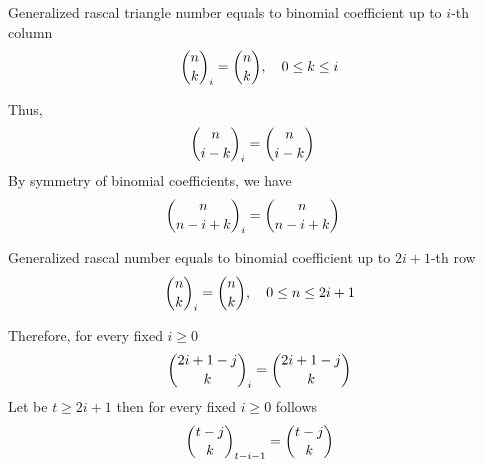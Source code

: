 \begin{proposition}
    Generalized rascal triangle number equals to binomial coefficient up to $i$-th column
    \begin{align}
        \binom{n}{k}_{i} = \binom{n}{k}, \quad 0 \leq k \leq i
    \end{align}
\end{proposition}
Thus,
\begin{align*}
    \binom{n}{i-k}_{i}        &= \binom{n}{i-k}
\end{align*}
By symmetry of binomial coefficients, we have
\begin{align*}
    \binom{n}{n-i+k}_{i}      &= \binom{n}{n-i+k}
\end{align*}
\begin{proposition}
    Generalized rascal number equals to binomial coefficient up to $2i+1$-th row
    \begin{align*}
        \binom{n}{k}_{i} = \binom{n}{k}, \quad 0 \leq n \leq 2i+1
    \end{align*}
\end{proposition}
Therefore, for every fixed $i \geq 0$
\begin{equation}
    \binom{2i+1-j}{k}_{i} = \binom{2i+1-j}{k}\label{eq:odd-row-identity}
\end{equation}
Let be $t \geq 2i+1$ then for every fixed $i \geq 0$ follows
\begin{align}
    \binom{t-j}{k}_{t-i-1} = \binom{t-j}{k}
\end{align}


